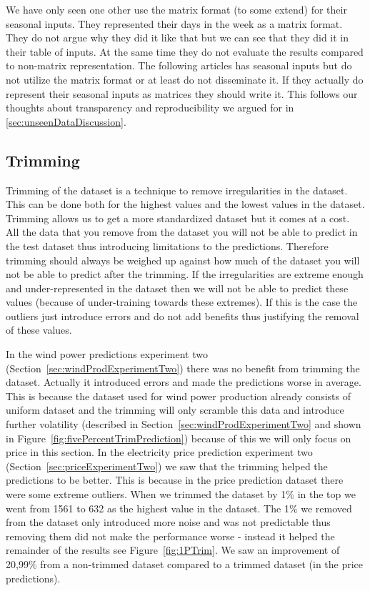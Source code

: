 We have only seen one other \cite{crowley2005weather} use the matrix format (to some extend) for their seasonal inputs. They represented their days in the week as a matrix format. They do not argue why they did it like that but we can see that they did it in their table of inputs. At the same time they do not evaluate the results compared to non-matrix representation. The following articles has seasonal inputs but do not utilize the matrix format \cite{szkuta1999electricity, singhal2011electricity} or at least do not disseminate it. If they actually do represent their seasonal inputs as matrices they should write it. This follows our thoughts about transparency and reproducibility we argued for in \ref{sec:unseenDataDiscussion}.

\subsection{Trimming}
Trimming of the dataset is a technique to remove irregularities in the dataset. This can be done both for the highest values and the lowest values in the dataset. Trimming allows us to get a more standardized dataset but it comes at a cost. All the data that you remove from the dataset you will not be able to predict in the test dataset thus introducing limitations to the predictions. Therefore trimming should always be weighed up against how much of the dataset you will not be able to predict after the trimming. If the irregularities are extreme enough and under-represented in the dataset then we will not be able to predict these values (because of under-training towards these extremes). If this is the case the outliers just introduce errors and do not add benefits thus justifying the removal of these values.

In the wind power predictions experiment two (Section~\ref{sec:windProdExperimentTwo}) there was no benefit from trimming the dataset. Actually it introduced errors and made the predictions worse in average. This is because the dataset used for wind power production already consists of uniform dataset and the trimming will only scramble this data and introduce further volatility (described in Section~\ref{sec:windProdExperimentTwo} and shown in Figure~\ref{fig:fivePercentTrimPrediction}) because of this we will only focus on price in this section. In the electricity price prediction experiment two (Section~\ref{sec:priceExperimentTwo}) we saw that the trimming helped the predictions to be better. This is because in the price prediction dataset there were some extreme outliers. When we trimmed the dataset by 1\% in the top we went from 1561 to 632 as the highest value in the dataset. The 1\% we removed from the dataset only introduced more noise and was not predictable thus removing them did not make the performance worse - instead it helped the remainder of the results see Figure~\ref{fig:1PTrim}. We saw an improvement of 20,99\% from a non-trimmed dataset compared to a trimmed dataset (in the price predictions).

